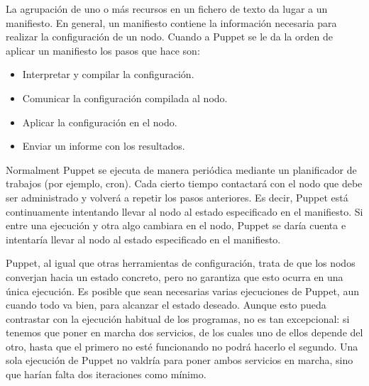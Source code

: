 La agrupación de uno o más recursos en un fichero de texto da lugar a un manifiesto. En general, un manifiesto contiene la información necesaria para realizar la configuración de un nodo. Cuando a Puppet se le da la orden de aplicar un manifiesto los pasos que hace son:
\begin{itemize}
\item Interpretar y compilar la configuración.
\item Comunicar la configuración compilada al nodo.
\item Aplicar la configuración en el nodo.
\item Enviar un informe con los resultados.
\end{itemize}

Normalment Puppet se ejecuta de manera periódica mediante un planificador de trabajos (por ejemplo, cron). Cada cierto tiempo contactará con el nodo que debe ser administrado y volverá a repetir los pasos anteriores. Es decir, Puppet está continuamente intentando llevar al nodo al estado especificado en el manifiesto. Si entre una ejecución y otra algo cambiara en el nodo, Puppet se daría cuenta e intentaría llevar al nodo al estado especificado en el manifiesto.

Puppet, al igual que otras herramientas de configuración, trata de que los nodos converjan hacia un estado concreto, pero no garantiza que esto ocurra en una única ejecución. Es posible que sean necesarias varias ejecuciones de Puppet, aun cuando todo va bien, para alcanzar el estado deseado. Aunque esto pueda contrastar con la ejecución habitual de los programas, no es tan excepcional: si tenemos que poner en marcha dos servicios, de los cuales uno de ellos depende del otro, hasta que el primero no esté funcionando no podrá hacerlo el segundo. Una sola ejecución de Puppet no valdría para poner ambos servicios en marcha, sino que harían falta dos iteraciones como mínimo.
